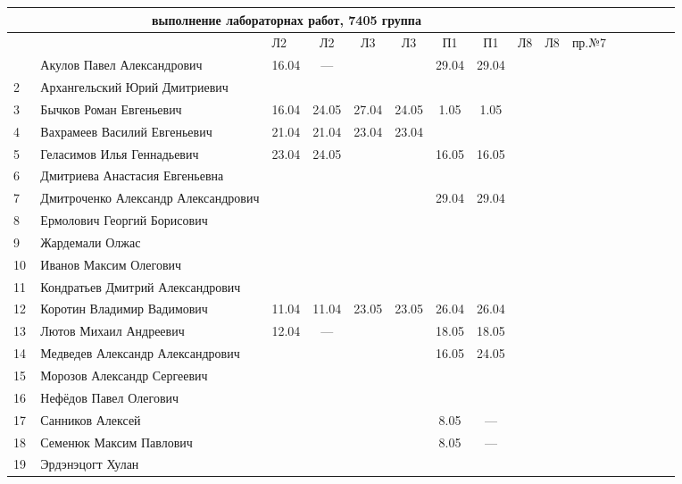 \documentclass[a4paper,11pt]{article}
\begin{document}
\newpage
%
\hspace{-2cm} %
\begin{tabular}{l|llccccccccccccc}
\multicolumn{10}{c}{выполнение лабораторнах работ, 7405 группа} \\
\toprule
&&Л2&Л2& Л3&Л3& П1&П1& Л8&Л8&пр.№7\\
\midrule
\,&Акулов Павел Александрович             &16.04& --- &     &     &29.04&29.04&&&\\
2\,&Архангельский Юрий Дмитриевич         &     &     &     &     &&&&\\
3\,&Бычков Роман Евгеньевич               &16.04&24.05&27.04&24.05& 1.05& 1.05&&&\\
4\,&Вахрамеев Василий Евгеньевич          &21.04&21.04&23.04&23.04&&&&\\
5\,&Геласимов Илья Геннадьевич            &23.04&24.05&     &     &16.05&16.05&&\\
\midrule
6\,&Дмитриева Анастасия Евгеньевна        &     &     &     &     &&&&\\
7\,&Дмитроченко Александр Александрович   &     &     &     &     &29.04&29.04&&&\\
8\,&Ермолович Георгий Борисович           &     &     &     &     &&&&\\
9\,&Жардемали Олжас                       &     &     &     &     &&&&\\
10\,&Иванов Максим Олегович               &&&&&&&&\\
\midrule
11\,&Кондратьев Дмитрий Александрович     &&&&&&&&\\
12\,&Коротин Владимир Вадимович           &11.04&11.04&23.05&23.05&26.04&26.04&&&\\
13\,&Лютов Михаил Андреевич               &12.04& --- &     &     &18.05&18.05&&\\
14\,&Медведев Александр Александрович     &     &     &     &     &16.05&24.05&&\\
15\,&Морозов Александр Сергеевич          &&&&&&&&\\
\midrule
16\,&Нефёдов Павел Олегович               &&&&&&&&\\
17\,&Санников Алексей                     &     &     &     &     & 8.05& --- &&&\\
18\,&Семенюк Максим Павлович              &     &     &     &     & 8.05& --- &&&\\
19\,&Эрдэнэцогт Хулан                     &&&&&&&&\\
\bottomrule
\end{tabular}
\end{document}
